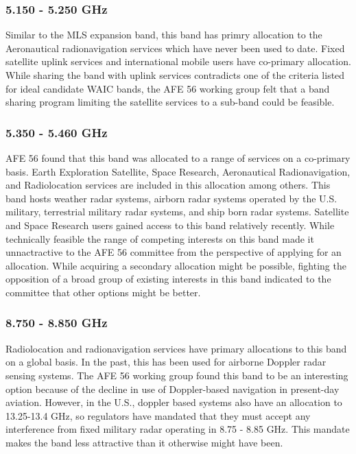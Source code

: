 \subsubsection{5.150 - 5.250 GHz}
Similar to the MLS expansion band, this band has primry allocation to the Aeronautical radionavigation services which have never been used to date. Fixed satellite uplink services and international mobile users have co-primary allocation. While sharing the band with uplink services contradicts one of the criteria listed for ideal candidate WAIC bands, the AFE 56 working group felt that a band sharing program limiting the satellite services to a sub-band could be feasible. 


\subsubsection{5.350 - 5.460 GHz}
AFE 56 found that this band was allocated to a range of services on a co-primary basis. Earth Exploration Satellite, Space Research, Aeronautical Radionavigation, and Radiolocation services are included in this allocation among others. This band hosts weather radar systems, airborn radar systems operated by the U.S. military, terrestrial military radar systems, and ship born radar systems. Satellite and Space Research users gained access to this band relatively recently. While technically feasible the range of competing interests on this band made it unnactractive to the AFE 56 committee from the perspective of applying for an allocation. While acquiring a secondary allocation might be possible, fighting the opposition of a broad group of existing interests in this band indicated to the committee that other options might be better. 

\subsubsection{8.750 - 8.850 GHz}
Radiolocation and radionavigation services have primary allocations to this band on a global basis. In the past, this has been used for airborne Doppler radar sensing systems. The AFE 56 working group found this band to be an interesting option because of the decline in use of Doppler-based navigation in present-day aviation. However, in the U.S., doppler based systems also have an allocation to 13.25-13.4 GHz, so regulators have mandated that they must accept any interference from fixed military radar operating in 8.75 - 8.85 GHz. This mandate makes the band less attractive than it otherwise might have been. 

